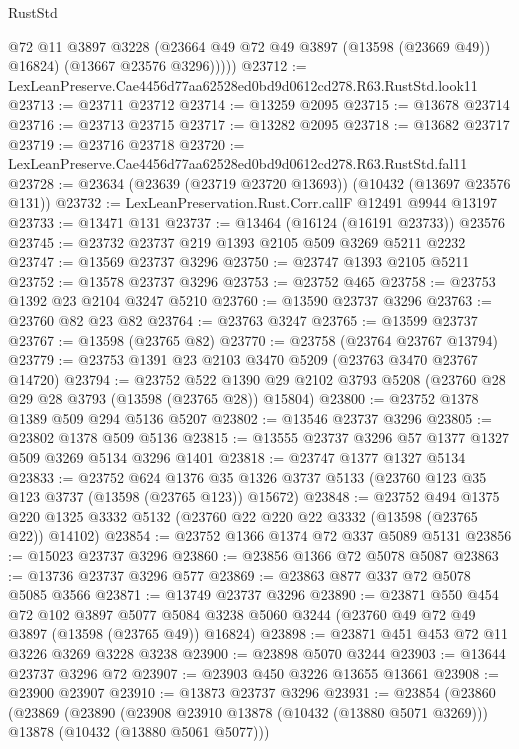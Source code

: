 \begin{lexlean}{RustStd}
\begin{coremodule}
            @72
            @11
            @3897
            @3228
            (@23664 @49 @72 @49 @3897 (@13598 (@23669 @49)) @16824)
            (@13667 @23576 @3296)))))
@23712 := LexLeanPreserve.Cae4456d77aa62528ed0bd9d0612cd278.R63.RustStd.look11
@23713 := @23711 @23712
@23714 := @13259 @2095
@23715 := @13678 @23714
@23716 := @23713 @23715
@23717 := @13282 @2095
@23718 := @13682 @23717
@23719 := @23716 @23718
@23720 := LexLeanPreserve.Cae4456d77aa62528ed0bd9d0612cd278.R63.RustStd.fal11
@23728 := @23634 (@23639 (@23719 @23720 @13693)) (@10432 (@13697 @23576 @131))
@23732 := LexLeanPreservation.Rust.Corr.callF @12491 @9944 @13197
@23733 := @13471 @131
@23737 := @13464 (@16124 (@16191 @23733)) @23576
@23745 := @23732 @23737 @219 @1393 @2105 @509 @3269 @5211 @2232
@23747 := @13569 @23737 @3296
@23750 := @23747 @1393 @2105 @5211
@23752 := @13578 @23737 @3296
@23753 := @23752 @465
@23758 := @23753 @1392 @23 @2104 @3247 @5210
@23760 := @13590 @23737 @3296
@23763 := @23760 @82 @23 @82
@23764 := @23763 @3247
@23765 := @13599 @23737
@23767 := @13598 (@23765 @82)
@23770 := @23758 (@23764 @23767 @13794)
@23779 := @23753 @1391 @23 @2103 @3470 @5209 (@23763 @3470 @23767 @14720)
@23794 := @23752
    @522
    @1390
    @29
    @2102
    @3793
    @5208
    (@23760 @28 @29 @28 @3793 (@13598 (@23765 @28)) @15804)
@23800 := @23752 @1378 @1389 @509 @294 @5136 @5207
@23802 := @13546 @23737 @3296
@23805 := @23802 @1378 @509 @5136
@23815 := @13555 @23737 @3296 @57 @1377 @1327 @509 @3269 @5134 @3296 @1401
@23818 := @23747 @1377 @1327 @5134
@23833 := @23752
    @624
    @1376
    @35
    @1326
    @3737
    @5133
    (@23760 @123 @35 @123 @3737 (@13598 (@23765 @123)) @15672)
@23848 := @23752
    @494
    @1375
    @220
    @1325
    @3332
    @5132
    (@23760 @22 @220 @22 @3332 (@13598 (@23765 @22)) @14102)
@23854 := @23752 @1366 @1374 @72 @337 @5089 @5131
@23856 := @15023 @23737 @3296
@23860 := @23856 @1366 @72 @5078 @5087
@23863 := @13736 @23737 @3296 @577
@23869 := @23863 @877 @337 @72 @5078 @5085 @3566
@23871 := @13749 @23737 @3296
@23890 := @23871
    @550
    @454
    @72
    @102
    @3897
    @5077
    @5084
    @3238
    @5060
    @3244
    (@23760 @49 @72 @49 @3897 (@13598 (@23765 @49)) @16824)
@23898 := @23871 @451 @453 @72 @11 @3226 @3269 @3228 @3238
@23900 := @23898 @5070 @3244
@23903 := @13644 @23737 @3296 @72
@23907 := @23903 @450 @3226 @13655 @13661
@23908 := @23900 @23907
@23910 := @13873 @23737 @3296
@23931 := @23854
    (@23860
      (@23869
        (@23890
          (@23908 @23910 @13878 (@10432 (@13880 @5071 @3269)))
          @13878
          (@10432 (@13880 @5061 @5077)))

\end{coremodule}
\end{lexlean}
